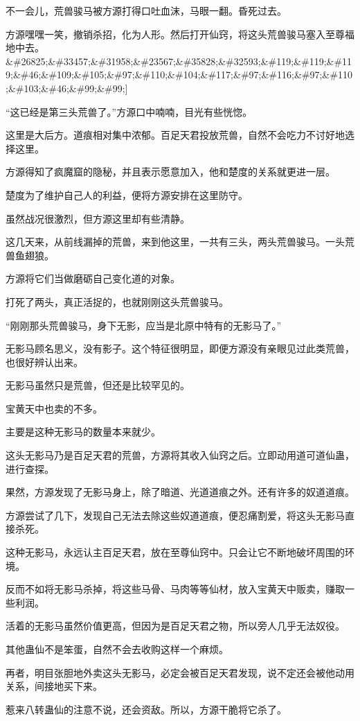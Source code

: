 \begin{this_body}
不一会儿，荒兽骏马被方源打得口吐血沫，马眼一翻。昏死过去。

方源嘿嘿一笑，撤销杀招，化为人形。然后打开仙窍，将这头荒兽骏马塞入至尊福地中去。\&\#26825;\&\#33457;\&\#31958;\&\#23567;\&\#35828;\&\#32593;\&\#119;\&\#119;\&\#119;\&\#46;\&\#109;\&\#105;\&\#97;\&\#110;\&\#104;\&\#117;\&\#97;\&\#116;\&\#97;\&\#110;\&\#103;\&\#46;\&\#99;\&\#99;]

“这已经是第三头荒兽了。”方源口中喃喃，目光有些恍惚。

这里是大后方。道痕相对集中浓郁。百足天君投放荒兽，自然不会吃力不讨好地选择这里。

方源得知了疯魔窟的隐秘，并且表示愿意加入，他和楚度的关系就更进一层。

楚度为了维护自己人的利益，便将方源安排在这里防守。

虽然战况很激烈，但方源这里却有些清静。

这几天来，从前线漏掉的荒兽，来到他这里，一共有三头，两头荒兽骏马。一头荒兽鱼翅狼。

方源将它们当做磨砺自己变化道的对象。

打死了两头，真正活捉的，也就刚刚这头荒兽骏马。

“刚刚那头荒兽骏马，身下无影，应当是北原中特有的无影马了。”

无影马顾名思义，没有影子。这个特征很明显，即便方源没有亲眼见过此类荒兽，也很好辨认出来。

无影马虽然只是荒兽，但还是比较罕见的。

宝黄天中也卖的不多。

主要是这种无影马的数量本来就少。

这头无影马乃是百足天君的荒兽，方源将其收入仙窍之后。立即动用道可道仙蛊，进行查探。

果然，方源发现了无影马身上，除了暗道、光道道痕之外。还有许多的奴道道痕。

方源尝试了几下，发现自己无法去除这些奴道道痕，便忍痛割爱，将这头无影马直接杀死。

这种无影马，永远认主百足天君，放在至尊仙窍中。只会让它不断地破坏周围的环境。

反而不如将无影马杀掉，将这些马骨、马肉等等仙材，放入宝黄天中贩卖，赚取一些利润。

活着的无影马虽然价值更高，但因为是百足天君之物，所以旁人几乎无法奴役。

其他蛊仙不是笨蛋，自然不会去收购这样一个麻烦。

再者，明目张胆地外卖这头无影马，必定会被百足天君发现，说不定还会被他动用关系，间接地买下来。

惹来八转蛊仙的注意不说，还会资敌。所以，方源干脆将它杀了。


\end{this_body}
